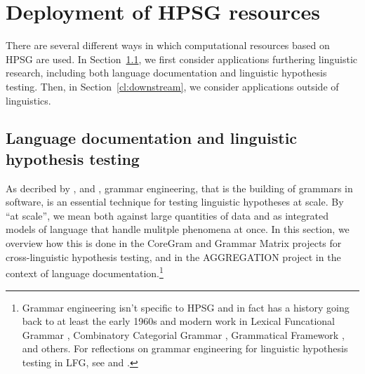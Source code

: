 \documentclass[output=paper,nonflat]{langsci/langscibook}
\begin{document}





\section{Deployment of HPSG resources}
\label{cl:deployment}

There are several different ways in which computational resources
based on HPSG are used.
In Section~\ref{cl:lang-doc}, we first consider applications furthering linguistic research,
including both language documentation and linguistic hypothesis testing.
Then, in Section~\ref{cl:downstream}, we consider applications outside of linguistics.


\subsection{Language documentation and linguistic hypothesis testing}
\label{cl:lang-doc}

As decribed by \citet{Mueller99a}, \citet{Bender2008c} and \citet{BFO2011a-u},
grammar engineering, that is the building of grammars in software, is
an essential technique for testing linguistic hypotheses at scale. By
``at scale'', we mean both against large quantities of data and as
integrated models of language that handle mulitple phenomena at
once. In this section, we overview how this is done in the CoreGram
and Grammar Matrix projects for cross-linguistic hypothesis testing,
and in the AGGREGATION project in the context of language
documentation.\footnote{Grammar engineering isn't specific to HPSG and
in fact has a history going back to at least the early 1960s \citep{Kay:63,ZFHW65a,Petrick65a-u,FBDPM71a-u}
and modern work in Lexical Funcational Grammar \citep{BKNS99a-ed}, Combinatory Categorial
Grammar \citep{BCPW2007a}, Grammatical Framework \citep{Ranta:09}, and others.
For reflections on grammar engineering for linguistic hypothesis testing
in LFG, see \citealt{BKNS99a-ed} and \citealt{King:16}.}

\end{document}
